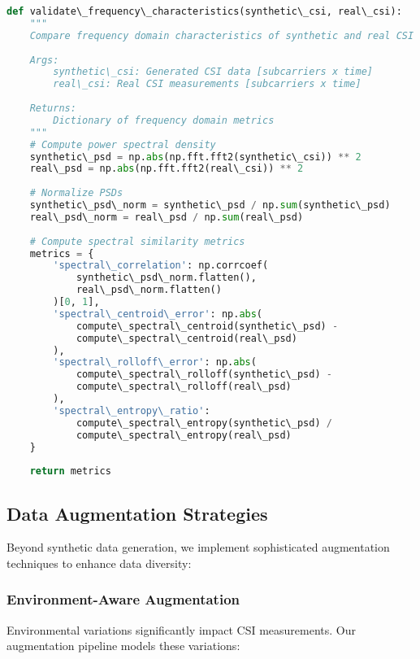 \documentclass[journal]{IEEEtran}
\begin{document}
\begin{lstlisting}[language=Python, caption=Frequency Domain Validation]
def validate\_frequency\_characteristics(synthetic\_csi, real\_csi):
    """
    Compare frequency domain characteristics of synthetic and real CSI
    
    Args:
        synthetic\_csi: Generated CSI data [subcarriers x time]
        real\_csi: Real CSI measurements [subcarriers x time]
    
    Returns:
        Dictionary of frequency domain metrics
    """
    # Compute power spectral density
    synthetic\_psd = np.abs(np.fft.fft2(synthetic\_csi)) ** 2
    real\_psd = np.abs(np.fft.fft2(real\_csi)) ** 2
    
    # Normalize PSDs
    synthetic\_psd\_norm = synthetic\_psd / np.sum(synthetic\_psd)
    real\_psd\_norm = real\_psd / np.sum(real\_psd)
    
    # Compute spectral similarity metrics
    metrics = {
        'spectral\_correlation': np.corrcoef(
            synthetic\_psd\_norm.flatten(), 
            real\_psd\_norm.flatten()
        )[0, 1],
        'spectral\_centroid\_error': np.abs(
            compute\_spectral\_centroid(synthetic\_psd) - 
            compute\_spectral\_centroid(real\_psd)
        ),
        'spectral\_rolloff\_error': np.abs(
            compute\_spectral\_rolloff(synthetic\_psd) - 
            compute\_spectral\_rolloff(real\_psd)
        ),
        'spectral\_entropy\_ratio': 
            compute\_spectral\_entropy(synthetic\_psd) / 
            compute\_spectral\_entropy(real\_psd)
    }
    
    return metrics
\end{lstlisting}

\subsection{Data Augmentation Strategies}

Beyond synthetic data generation, we implement sophisticated augmentation techniques to enhance data diversity:

\subsubsection{Environment-Aware Augmentation}

Environmental variations significantly impact CSI measurements. Our augmentation pipeline models these variations:
\end{document}
